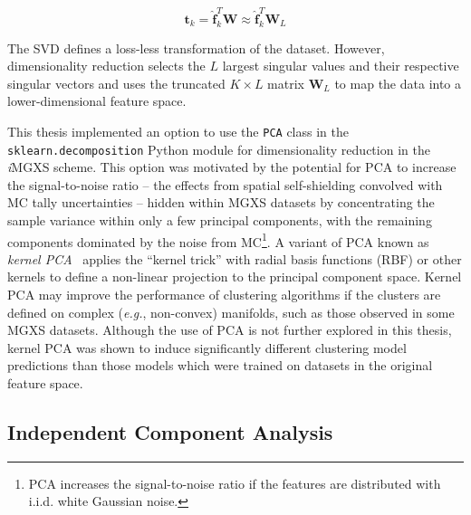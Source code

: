 \begin{equation}
\label{eqn:chap10-svd-transform-sample}
\boldsymbol{t}_{k} = \boldsymbol{\hat{f}}_{k}^{T}\boldsymbol{W} \approx \boldsymbol{\hat{f}}_{k}^{T}\boldsymbol{W}_{L}
\end{equation}

\noindent The SVD defines a loss-less transformation of the dataset. However, dimensionality reduction selects the $L$ largest singular values and their respective singular vectors and uses the truncated $K \times L$ matrix $\boldsymbol{W}_{L}$ to map the data into a lower-dimensional feature space.

This thesis implemented an option to use the \texttt{PCA} class in the \texttt{sklearn.decomposition} Python module for dimensionality reduction in the \textit{i}\ac{MGXS} scheme. This option was motivated by the potential for PCA to increase the signal-to-noise ratio -- the effects from spatial self-shielding convolved with \ac{MC} tally uncertainties -- hidden within \ac{MGXS} datasets by concentrating the sample variance within only a few principal components, with the remaining components dominated by the noise from \ac{MC}\footnote{PCA increases the signal-to-noise ratio if the features are distributed with i.i.d. white Gaussian noise.}. A variant of PCA known as \textit{kernel PCA}~\cite{scholkopf1997kernelpca} applies the ``kernel trick'' with radial basis functions (RBF) or other kernels to define a non-linear projection to the principal component space. Kernel PCA may improve the performance of clustering algorithms if the clusters are defined on complex (\textit{e.g.}, non-convex) manifolds, such as those observed in some \ac{MGXS} datasets. Although the use of PCA is not further explored in this thesis, kernel PCA was shown to induce significantly different clustering model predictions than those models which were trained on datasets in the original feature space.


  
\subsection{Independent Component Analysis}
\label{subsec:chap10-ica}

